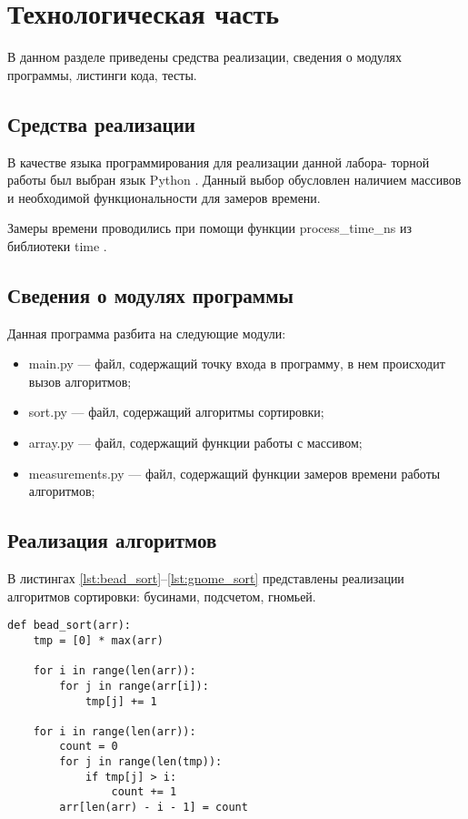 \chapter{Технологическая часть}

В данном разделе приведены средства реализации, сведения о модулях программы, листинги кода, тесты.

\section{Средства реализации}

В качестве языка программирования для реализации данной лабора-
торной работы был выбран язык Python \cite{python}. Данный выбор обусловлен наличием массивов и необходимой функциональности для замеров времени.

Замеры времени проводились при помощи функции process\_time\_ns из библиотеки time \cite{python-time}.

\section{Сведения о модулях программы}

Данная программа разбита на следующие модули:

\begin{itemize}
	\item main.py --- файл, содержащий точку входа в программу, в нем происходит вызов алгоритмов;
	\item sort.py --- файл, содержащий алгоритмы сортировки;
	\item array.py --- файл, содержащий функции работы с массивом;
	\item measurements.py --- файл, содержащий функции замеров времени работы алгоритмов;
\end{itemize}

\section{Реализация алгоритмов}

В листингах \ref{lst:bead_sort}--\ref{lst:gnome_sort} представлены реализации алгоритмов сортировки: бусинами, подсчетом, гномьей.
\clearpage
\begin{center}
\captionsetup{justification=raggedright,singlelinecheck=off}
\begin{lstlisting}[label=lst:bead_sort,caption=Алгоритм сортировки бусинами]
def bead_sort(arr):
	tmp = [0] * max(arr)
	
	for i in range(len(arr)):
		for j in range(arr[i]):
			tmp[j] += 1        
	
	for i in range(len(arr)):
		count = 0
		for j in range(len(tmp)):
			if tmp[j] > i:
				count += 1
		arr[len(arr) - i - 1] = count

\end{lstlisting} 
\end{center}

